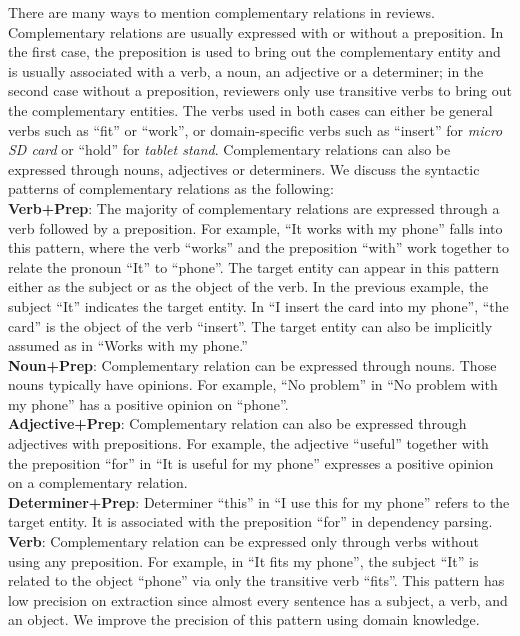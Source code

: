 There are many ways to mention complementary relations in reviews. Complementary relations are usually expressed with or without a preposition. In the first case, the preposition is used to bring out the complementary entity and is usually associated with a verb, a noun, an adjective or a determiner; in the second case without a preposition, reviewers only use transitive verbs to bring out the complementary entities. The verbs used in both cases can either be general verbs such as ``fit'' or ``work'', or domain-specific verbs such as ``insert'' for \textit{micro SD card} or ``hold'' for \textit{tablet stand}. Complementary relations can also be expressed through nouns, adjectives or determiners. We discuss the syntactic patterns of complementary relations as the following:\\
\textbf{Verb+Prep}: The majority of complementary relations are expressed through a verb followed by a preposition. For example, ``It works with my phone'' falls into this pattern, where the verb ``works'' and the preposition ``with'' work together to relate the pronoun ``It'' to ``phone''. The target entity can appear in this pattern either as the subject or as the object of the verb. In the previous example, the subject ``It'' indicates the target entity. In ``I insert the card into my phone'', ``the card'' is the object of the verb ``insert''. The target entity can also be implicitly assumed as in ``Works with my phone.''\\
\textbf{Noun+Prep}: Complementary relation can be expressed through nouns. Those nouns typically have opinions. For example, ``No problem'' in ``No problem with my phone'' has a positive opinion on ``phone''.\\
\textbf{Adjective+Prep}: Complementary relation can also be expressed through adjectives with prepositions. For example, the adjective ``useful'' together with the preposition ``for'' in ``It is useful for my phone'' expresses a positive opinion on a complementary relation.\\
\textbf{Determiner+Prep}: Determiner ``this'' in ``I use this for my phone'' refers to the target entity. It is associated with the preposition ``for'' in dependency parsing.\\
\textbf{Verb}: Complementary relation can be expressed only through verbs without using any preposition. For example, in ``It fits my phone'', the subject ``It'' is related to the object ``phone'' via only the transitive verb ``fits''. This pattern has low precision on extraction since almost every sentence has a subject, a verb, and an object. We improve the precision of this pattern using domain knowledge.

